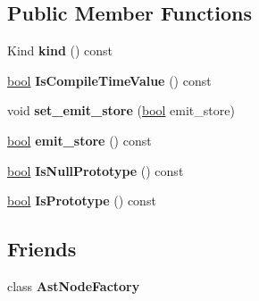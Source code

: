 \subsection*{Public Member Functions}
\begin{DoxyCompactItemize}
\item 
\mbox{\label{classv8_1_1internal_1_1ObjectLiteralProperty_abcbe86732902c5bd37ca4535608417b3}} 
Kind {\bfseries kind} () const
\item 
\mbox{\label{classv8_1_1internal_1_1ObjectLiteralProperty_aa55305752d1fea0b708bfb4e2df42058}} 
\mbox{\hyperlink{classbool}{bool}} {\bfseries Is\+Compile\+Time\+Value} () const
\item 
\mbox{\label{classv8_1_1internal_1_1ObjectLiteralProperty_a2b5204d32d95776f42c0c514e88471cb}} 
void {\bfseries set\+\_\+emit\+\_\+store} (\mbox{\hyperlink{classbool}{bool}} emit\+\_\+store)
\item 
\mbox{\label{classv8_1_1internal_1_1ObjectLiteralProperty_a0ff5e498a85d469ed7e08cb222e7311d}} 
\mbox{\hyperlink{classbool}{bool}} {\bfseries emit\+\_\+store} () const
\item 
\mbox{\label{classv8_1_1internal_1_1ObjectLiteralProperty_a6ef4b3475971c4a87c7c39b1ea5f208a}} 
\mbox{\hyperlink{classbool}{bool}} {\bfseries Is\+Null\+Prototype} () const
\item 
\mbox{\label{classv8_1_1internal_1_1ObjectLiteralProperty_a415b8b399cde79382aecdf4ee6364244}} 
\mbox{\hyperlink{classbool}{bool}} {\bfseries Is\+Prototype} () const
\end{DoxyCompactItemize}
\subsection*{Friends}
\begin{DoxyCompactItemize}
\item 
\mbox{\label{classv8_1_1internal_1_1ObjectLiteralProperty_a8d587c8ad3515ff6433eb83c578e795f}} 
class {\bfseries Ast\+Node\+Factory}
\end{DoxyCompactItemize}

